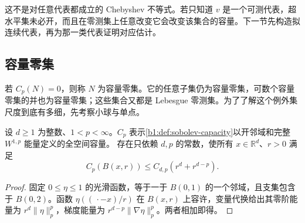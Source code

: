 这不是对任意代表都成立的 Chebyshev 不等式。若只知道 \(v\) 是一个可测代表，超水平集未必开，而且在零测集上任意改变它会改变该集合的容量。下一节先构造拟连续代表，再为那一类代表证明对应估计。

\subsection{容量零集}
\label{b1:subsec:260104}

若 \(C_p(N)=0\)，则称 \(N\) 为容量零集。它的任意子集仍为容量零集，可数个容量零集的并也为容量零集；这些集合又都是 Lebesgue 零测集。为了了解这个例外集尺度到底有多细，先考察小球与单点。

\begin{proposition}\label{b1:prop:sobolev-capacity-balls}
设 \(d\geq1\) 为整数、\(1<p<\infty\)。\(C_p\) 表示\cref{b1:def:sobolev-capacity}以开邻域和完整 \(W^{1,p}\) 能量定义的全空间容量。
存在只依赖 \(d,p\) 的常数，使所有 \(x\in\mathbb R^d\)、\(r>0\) 满足
\[
 C_p(B(x,r))\le C_{d,p}(r^d+r^{d-p}).
\]
\end{proposition}
\begin{proof}
固定 \(0\le\eta\le1\) 的光滑函数，等于一于 \(B(0,1)\) 的一个邻域，且支集包含于 \(B(0,2)\)。函数 \(\eta((\,\cdot-x)/r)\) 在 \(B(x,r)\) 上容许，变量代换给出其零阶能量为 \(r^d\|\eta\|_p^p\)，梯度能量为 \(r^{d-p}\|\nabla\eta\|_p^p\)。两者相加即得。
\end{proof}


